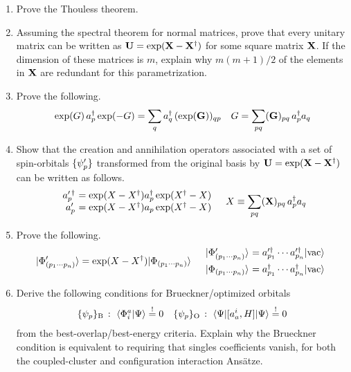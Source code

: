 \documentclass[11pt]{article}
\begin{document}
\begin{enumerate}
\item
Prove the Thouless theorem.

\item
Assuming the spectral theorem for normal matrices, prove that every unitary matrix can be written as
$
  \mathbf{U}
=
  \mathrm{exp}(\mathbf{X} - \mathbf{X}^\dagger)
$
for some square matrix $\mathbf{X}$.
If the dimension of these matrices is $m$, explain why $m(m+1)/2$ of the elements in $\mathbf{X}$ are redundant for this parametrization.

\item
Prove the following.
\begin{align}
  \mathrm{exp}(G)\,a_p^\dagger\,\mathrm{exp}(-G)
=
  \sum_q
  a_q^\dagger\,
  (\mathrm{exp}(\mathbf{G}))_{qp}
&&
  G
=
  \sum_{pq}
  (\mathbf{G})_{pq}\,
  a_p^\dagger a_q
\end{align}



\item
Show that the creation and annihilation operators associated with a set of spin-orbitals $\{\psi _p'\}$ transformed from the original basis by $\mathbf{U}=\mathrm{exp}(\mathbf{X} - \mathbf{X}^\dagger)$ can be written as follows.
\begin{align}
\begin{array}{r@{\ }l}
  a_p^{\prime\,\dagger}
&=
  \mr{exp}(X - X\dg)
  a_p\dg\,
  \mr{exp}(X\dg - X)
\\
  a_p^{\prime}
&=
  \mr{exp}(X - X\dg)
  a_p\,
  \mr{exp}(X\dg - X)
\end{array}
&&
  X
\equiv
  \sum_{pq}
  (\bo{X})_{pq}\,
  a_p\dg a_q
\end{align}


\item
Prove the following.
\begin{align}
  \kt{\F'_{(p_1\cd p_n)}}
=
  \mr{exp}(X - X\dg)
  \kt{\F_{(p_1\cd p_n)}}
&&
\begin{array}{r@{\ }l}
  \kt{\F'_{(p_1\cd p_n)}}
&=
  a_{p_1}^{\prime \dagger}
\cd
  a_{p_n}^{\prime \dagger}
  \kt{\vac}
\\[5pt]
  \kt{\F_{(p_1\cd p_n)}}
&=
  a_{p_1}^{ \dagger}
\cd
  a_{p_n}^{ \dagger}
  \kt{\vac}
\end{array}
\end{align}

\item
Derive the following conditions for Brueckner/optimized orbitals
\begin{align}
\label{eq:brueckner-and-oo-explicit-condition}
  \{\psi _p\}_{\mathrm{B}}\,:\,\,
  \langle\Phi _i^a|\Psi \rangle
\overset{!}{=}
  0
&&
  \{\psi _p\}_{\mathrm{O}}\,:\,\,
  \langle\Psi |[a_a^i, H]|\Psi \rangle
\overset{!}{=}
  0
\end{align}
from the best-overlap/best-energy criteria.  Explain why the Brueckner condition is equivalent to requiring that singles coefficients vanish, for both the coupled-cluster and configuration interaction Ans\"atze.



\end{enumerate}
\end{document}
